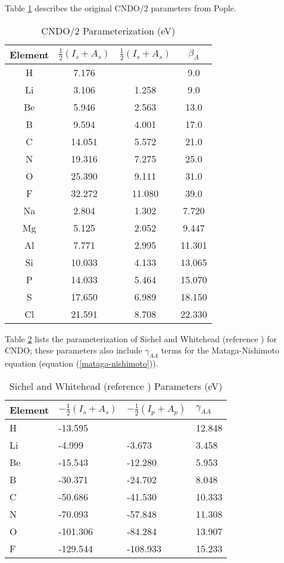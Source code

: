 Table \ref{table-cndo2} describes the original CNDO/2 parameters from
Pople. 

\begin{table}
\caption{CNDO/2 Parameterization (eV)}
\label{table-cndo2}
\begin{center}
\begin{tabular}{cccc}\\ \hline
Element & $\frac{1}{2}(I_s+A_s)$ & $\frac{1}{2}(I_s+A_s)$ & $\beta_A$
\\ \hline
H 	& 7.176 	&		& 9.0 \\ 
Li 	& 3.106 	& 1.258 	& 9.0 \\
Be 	& 5.946		& 2.563		& 13.0 \\
B 	& 9.594		& 4.001		& 17.0 \\
C 	& 14.051	& 5.572		& 21.0 \\
N 	& 19.316	& 7.275		& 25.0 \\
O 	& 25.390	& 9.111		& 31.0 \\
F 	& 32.272	& 11.080	& 39.0 \\
Na 	& 2.804		& 1.302		& 7.720\\
Mg 	& 5.125		& 2.052		& 9.447\\
Al 	& 7.771		& 2.995		& 11.301\\
Si 	& 10.033	& 4.133		& 13.065\\
P 	& 14.033	& 5.464		& 15.070\\
S 	& 17.650	& 6.989		& 18.150\\
Cl 	& 21.591	& 8.708		& 22.330\\ \hline
\end{tabular}
\end{center}
\end{table}

Table \ref{sichel-params} lists the parameterization of Sichel and
Whitehead (reference \cite{Sichel67}) for CNDO; these parameters also
include $\gamma_{AA}$ terms for the Mataga-Nishimoto equation
(equation (\ref{mataga-nishimoto})).

\begin{table}
\caption{Sichel and Whitehead (reference \cite{Sichel67}) Parameters (eV)}
\label{sichel-params}
\begin{center}
\begin{tabular}{llll}\\ \hline
Element & $-\frac{1}{2}(I_s + A_s)$ & $-\frac{1}{2}(I_p + A_p)$ 
	& $\gamma_{AA}$ \\ \hline
H 	& -13.595	& 		& 12.848 \\
Li 	& -4.999	& -3.673	& 3.458 \\
Be 	& -15.543	& -12.280	& 5.953 \\
B 	& -30.371	& -24.702	& 8.048 \\
C 	& -50.686	& -41.530	& 10.333 \\
N 	& -70.093	& -57.848	& 11.308 \\
O 	& -101.306	& -84.284	& 13.907 \\
F 	& -129.544	& -108.933	& 15.233 \\ \hline
\end{tabular}
\end{center}
\end{table}


